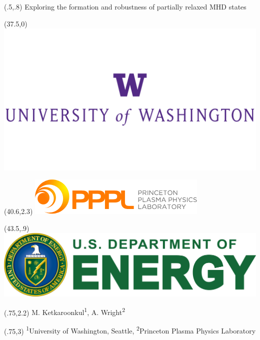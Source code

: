 \documentclass{beamer}
\begin{document}
\begin{frame}[t]
\begin{textblock}{30}(.5,.8)
\fontsize{72}{60}\selectfont Exploring the formation and robustness of partially relaxed MHD states
\end{textblock}
\begin{textblock}{24}(37.5,0)
\includegraphics[scale=.1]{uofwa.png}
\end{textblock}
\begin{textblock}{24}(40.6,2.3)
\includegraphics[scale=1]{pppl.png}
\end{textblock}
\begin{textblock}{24}(43.5,.9)
\includegraphics[scale=.1]{doe_logo.png}\break
\end{textblock}




\begin{textblock}{28}(.75,2.2)
{\huge
    M. Ketkaroonkul\textsuperscript{1},
    A. Wright\textsuperscript{2}
}
\end{textblock}
\begin{textblock}{24}(.75,3)
{\large
    \textsuperscript{1}University of Washington, Seattle,
    \textsuperscript{2}Princeton Plasma Physics Laboratory
}
\end{textblock}





\end{frame}
\end{document}
